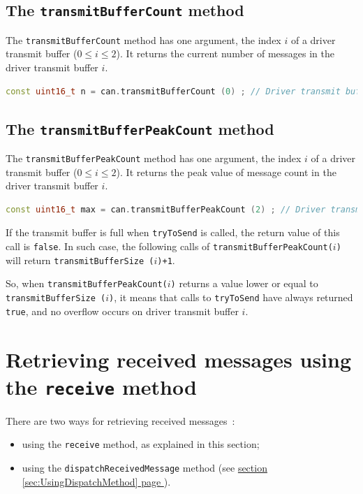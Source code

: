 \documentclass[10pt, a4paper, obeyspaces]{extarticle}
\newcommand \sectionLabel[2]{\section{#1}\label{sec:#2}}
\newcommand\refSectionPage[1]{\hyperref[sec:#1]{section \ref*{sec:#1} page \pageref{sec:#1}}}
\begin{document}
\subsection{The \texttt{transmitBufferCount} method}

The \texttt{transmitBufferCount} method has one argument, the index $i$ of a driver transmit buffer ($0 \leqslant i \leqslant 2$). It returns the current number of messages in the driver transmit buffer $i$.
{ \small\begin{lstlisting}[language=c++]
const uint16_t n = can.transmitBufferCount (0) ; // Driver transmit buffer 0
\end{lstlisting}}


\subsection{The \texttt{transmitBufferPeakCount} method}

The \texttt{transmitBufferPeakCount} method has one argument, the index $i$ of a driver transmit buffer ($0 \leqslant i \leqslant 2$). It returns the peak value of message count in the driver transmit buffer $i$.
{ \small\begin{lstlisting}[language=c++]
const uint16_t max = can.transmitBufferPeakCount (2) ; // Driver transmit buffer 2
\end{lstlisting}}

If the transmit buffer is full when \texttt{tryToSend} is called, the return value of this call is \texttt{false}. In such case, the following calls of \texttt{transmitBufferPeakCount($i$)} will return \texttt{transmitBufferSize ($i$)+1}. 

So, when \texttt{transmitBufferPeakCount($i$)} returns a value lower or equal to \texttt{transmitBufferSize ($i$)}, it means that calls to \texttt{tryToSend} have always returned \texttt{true}, and no overflow occurs on driver transmit buffer $i$.

















\sectionLabel{Retrieving received messages using the \texttt{receive} method}{UsingReceiveMethod}

There are two ways for retrieving received messages~:
\begin{itemize}
  \item using the \texttt{receive} method, as explained in this section;
  \item using the \texttt{dispatchReceivedMessage} method (see \refSectionPage{UsingDispatchMethod}).
\end{itemize}
\end{document}
